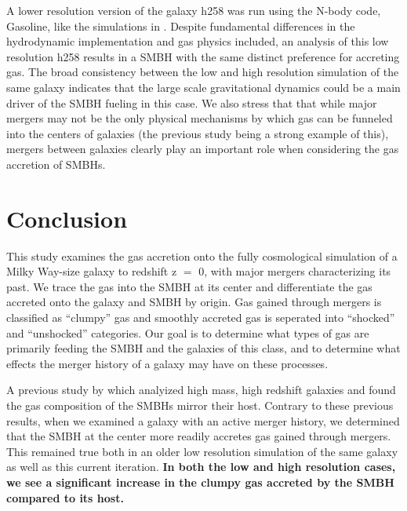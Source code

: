 \documentclass[manuscript]{aastex}
\begin{document}
A lower resolution version of the galaxy h258 was run using the N-body code, Gasoline, like the simulations in \cite{Bellovary2013}. Despite fundamental differences in the hydrodynamic implementation and gas physics included, an analysis of this low resolution h258 results in a SMBH with the same distinct preference for accreting gas. The broad consistency between the low and high resolution simulation of the same galaxy indicates that the large scale gravitational dynamics could be a main driver of the SMBH fueling in this case. We also stress that that while major mergers may not be the only physical mechanisms by which gas can be funneled into the centers of galaxies (the previous study being a strong example of this), mergers between galaxies clearly play an important role when considering the gas accretion of SMBHs.




\section{Conclusion}
This study examines the gas accretion onto the fully cosmological simulation of a Milky Way-size galaxy to redshift z $=$ 0, with major mergers characterizing its past. We trace the gas into the SMBH at its center and differentiate the gas accreted onto the galaxy and SMBH by origin. Gas gained through mergers is classified as ``clumpy'' gas and smoothly accreted gas is seperated into ``shocked'' and ``unshocked'' categories. Our goal is to determine what types of gas are primarily feeding the SMBH and the galaxies of this class, and to determine what effects the merger history of a galaxy may have on these processes.

A previous study by \cite{Bellovary2013} which analyized high mass, high redshift galaxies and found the gas composition of the SMBHs mirror their host. Contrary to these previous results, when we examined a galaxy with an active merger history, we determined that the SMBH at the center more readily accretes gas gained through mergers. This remained true both in an older low resolution simulation of the same galaxy as well as this current iteration. \textbf{In both the low and high resolution cases, we see a significant increase in the clumpy gas accreted by the SMBH compared to its host.} 
\end{document}
